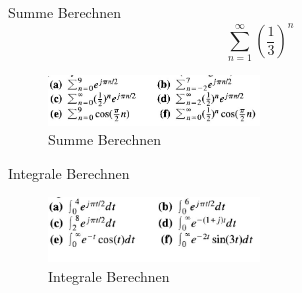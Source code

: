 \documentclass[addpoints,12pt,twoside]{exam} %
\begin{document}
\begin{questions}
            
            \question[4]
            Summe Berechnen 
            \[ \sum_{n=1}^{\infty} \left( \frac{1}{3}  \right)^n
            \]
            \begin{figure}[h]
            \includegraphics[width=0.5\textwidth]{auf2}
            \caption{ Summe Berechnen}
            \label{fig: Summe Berechnen}
            \end{figure}
            
            \question[6]
            Integrale Berechnen
            \begin{figure}[h]
            \includegraphics[width=0.5\textwidth]{auf3}
            \caption{Integrale Berechnen}
            \label{fig:Integrale Berechnen}
            \end{figure}

            
    \end{questions}
\newpage
\end{document}
